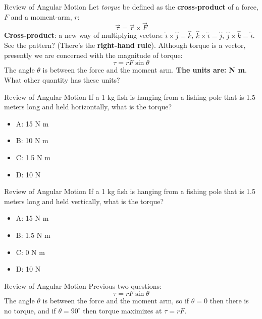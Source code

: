 \documentclass{beamer}
\begin{document}
\begin{frame}{Review of Angular Motion}
Let \textit{torque} be defined as the \textbf{cross-product} of a force, $F$ and a moment-arm, $r$:
\begin{equation}
\vec{\tau} = \vec{r} \times \vec{F}
\end{equation}
\textbf{Cross-product}: a new way of multiplying vectors: $\hat{i} \times \hat{j} = \hat{k}$, $\hat{k} \times \hat{i} = \hat{j}$, $\hat{j} \times \hat{k} = \hat{i}$.  See the pattern?  (There's the \textbf{right-hand rule}).  Although torque is a vector, presently we are concerned with the magnitude of torque:
\begin{equation}
\tau = r F \sin\theta
\end{equation}
The angle $\theta$ is between the force and the moment arm.  \textbf{The units are: N m}.  What other quantity has these units?
\end{frame}

\begin{frame}{Review of Angular Motion}
If a 1 kg fish is hanging from a fishing pole that is 1.5 meters long and held horizontally, what is the torque?
\begin{itemize}
\item A: 15 N m
\item B: 10 N m
\item C: 1.5 N m
\item D: 10 N
\end{itemize}
\end{frame}

\begin{frame}{Review of Angular Motion}
If a 1 kg fish is hanging from a fishing pole that is 1.5 meters long and held vertically, what is the torque?
\begin{itemize}
\item A: 15 N m
\item B: 1.5 N m
\item C: 0 N m
\item D: 10 N
\end{itemize}
\end{frame}

\begin{frame}{Review of Angular Motion}
Previous two questions:
\begin{equation}
\tau = r F \sin\theta
\end{equation}
The angle $\theta$ is between the force and the moment arm, so if $\theta = 0$ then there is no torque, and if $\theta = 90^{\circ}$ then torque maximizes at $\tau = rF$.
\end{frame}
\end{document}
